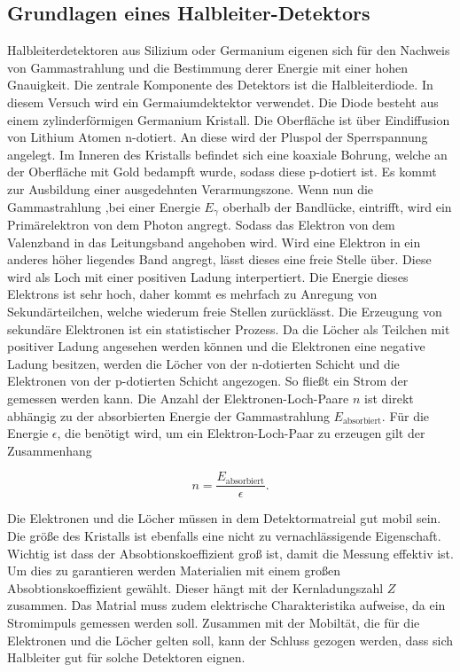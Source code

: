 \subsection{Grundlagen eines Halbleiter-Detektors}
\label{sec:Halbleiter-Detektor}

Halbleiterdetektoren aus Silizium oder Germanium eigenen sich für den Nachweis von Gammastrahlung und die Bestimmung derer Energie mit einer hohen Gnauigkeit.
Die zentrale Komponente des Detektors ist die Halbleiterdiode. In diesem Versuch wird ein Germaiumdektektor verwendet.
Die Diode besteht aus einem zylinderförmigen Germanium Kristall. Die Oberfläche ist über Eindiffusion von Lithium Atomen n-dotiert.
An diese wird der Pluspol der Sperrspannung angelegt. Im Inneren des Kristalls befindet sich eine koaxiale Bohrung, welche an der Oberfläche mit Gold bedampft wurde, sodass diese p-dotiert ist.
Es kommt zur Ausbildung einer ausgedehnten Verarmungszone. Wenn nun die Gammastrahlung ,bei einer Energie $E_{\gamma} $ oberhalb der Bandlücke, eintrifft, wird ein Primärelektron von dem Photon angregt.
Sodass das Elektron von dem Valenzband in das Leitungsband angehoben wird. Wird eine Elektron in ein anderes höher liegendes Band angregt, lässt dieses eine freie Stelle über. 
Diese wird als Loch mit einer positiven Ladung interpertiert.
Die Energie dieses Elektrons ist sehr hoch, daher kommt es mehrfach zu Anregung von Sekundärteilchen, welche wiederum freie Stellen zurücklässt. Die Erzeugung von sekundäre Elektronen ist ein statistischer Prozess.
Da die Löcher als Teilchen mit positiver Ladung angesehen werden können und die Elektronen eine negative Ladung besitzen, werden die Löcher von der n-dotierten Schicht und die Elektronen von der p-dotierten Schicht angezogen.
So fließt ein Strom der gemessen werden kann.
Die Anzahl der Elektronen-Loch-Paare $n$ ist direkt abhängig zu der absorbierten Energie der Gammastrahlung $E_{\text{absorbiert}}$. Für die Energie $\epsilon$, die benötigt wird,
um ein Elektron-Loch-Paar zu erzeugen gilt der Zusammenhang

\begin{equation}
    n = \frac{E_{\text{absorbiert}}}{\epsilon}.
\end{equation}

Die Elektronen und die Löcher müssen in dem Detektormatreial gut mobil sein. Die größe des Kristalls ist ebenfalls eine nicht zu vernachlässigende Eigenschaft.
Wichtig ist dass der Absobtionskoeffizient groß ist, damit die Messung effektiv ist. Um dies zu garantieren werden Materialien mit einem großen Absobtionskoeffizient
gewählt. Dieser hängt mit der Kernladungszahl $Z$ zusammen. Das Matrial muss zudem elektrische Charakteristika aufweise, da ein Stromimpuls gemessen werden soll. Zusammen mit der Mobiltät, die für die
Elektronen und die Löcher gelten soll, kann der Schluss gezogen werden, dass sich Halbleiter gut für solche Detektoren eignen.

